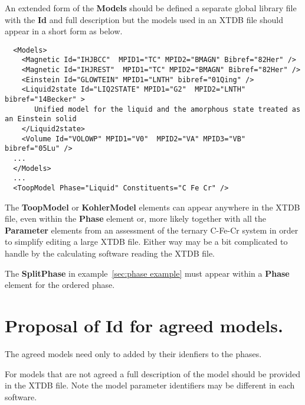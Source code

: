 \documentclass{article}
\begin{document}
\begin{appendices}
An extended form of the {\bf Models} should be defined a separate
global library file with the {\bf Id} and full description but the
models used in an XTDB file should appear in a short form as below.

{\small
\begin{verbatim}
  <Models>
    <Magnetic Id="IHJBCC"  MPID1="TC" MPID2="BMAGN" Bibref="82Her" />
    <Magnetic Id="IHJREST"  MPID1="TC" MPID2="BMAGN" Bibref="82Her" />
    <Einstein Id="GLOWTEIN" MPID1="LNTH" bibref="01Qing" /> 
    <Liquid2state Id="LIQ2STATE" MPID1="G2"  MPID2="LNTH" bibref="14Becker" >
       Unified model for the liquid and the amorphous state treated as an Einstein solid
    </Liquid2state>
    <Volume Id="VOLOWP" MPID1="V0"  MPID2="VA" MPID3="VB" bibref="05Lu" />
  ...
  </Models>
  ...
  <ToopModel Phase="Liquid" Constituents="C Fe Cr" />
\end{verbatim}
}

The {\bf ToopModel} or {\bf KohlerModel} elements can appear anywhere
in the XTDB file, even within the {\bf Phase} element or, more likely
together with all the {\bf Parameter} elements from an assessment of
the ternary C-Fe-Cr system in order to simplify editing a large XTDB
file.  Either way may be a bit complicated to handle by the
calculating software reading the XTDB file.

The {\bf SplitPhase} in example~\ref{sec:phase example} must appear
within a {\bf Phase} element for the ordered phase.

\newpage
\section{Proposal of Id for agreed models.}\label{sec:modelapp}

The agreed models need only to added by their idenfiers to the phases.

For models that are not agreed a full description of the model should
be provided in the XTDB file.  Note the model parameter identifiers
may be different in each software.


\end{appendices}
\end{document}
